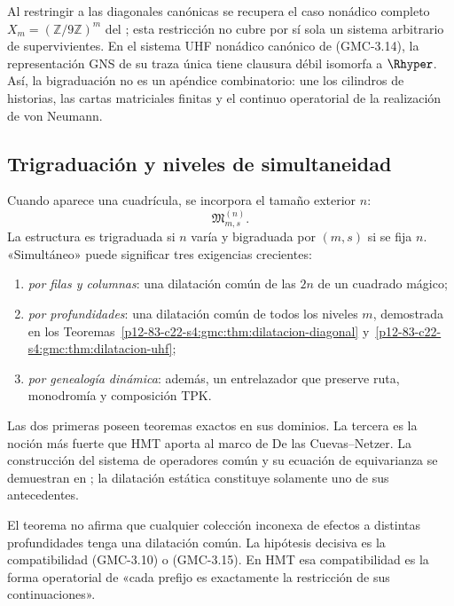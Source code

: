 Al restringir  a las diagonales canónicas se recupera
el caso nonádico completo $X_m=(\mathbb Z/9\mathbb Z)^m$ del
; esta restricción no cubre por sí sola un
sistema arbitrario de supervivientes. En el sistema UHF nonádico canónico de
\textup{(GMC-3.14)}, la representación GNS de su traza única tiene clausura débil
isomorfa a $\Rhyper$. Así, la bigraduación no es un apéndice combinatorio: une
los cilindros de historias, las cartas matriciales finitas y el continuo
operatorial de la realización de von Neumann.

\subsection{Trigraduación y niveles de simultaneidad}

Cuando aparece una cuadrícula, se incorpora el tamaño exterior $n$:
\[
 \mathfrak M_{m,s}^{(n)}.
 \tag{GMC-3.17}
\]
La estructura es trigraduada si $n$ varía y bigraduada por $(m,s)$ si se fija
$n$. «Simultáneo» puede significar tres exigencias crecientes:

\begin{enumerate}
 \item \emph{por filas y columnas}: una dilatación común de las $2n$ \POVM
 de un cuadrado mágico;
 \item \emph{por profundidades}: una dilatación común de todos los niveles
 $m$, demostrada en los Teoremas~\ref{p12-83-c22-s4:gmc:thm:dilatacion-diagonal}
 y~\ref{p12-83-c22-s4:gmc:thm:dilatacion-uhf};
 \item \emph{por genealogía dinámica}: además, un entrelazador que preserve
 ruta, monodromía y composición TPK.
\end{enumerate}

Las dos primeras poseen teoremas exactos en sus dominios. La tercera es la
noción más fuerte que HMT aporta al marco de De las Cuevas--Netzer. La
construcción del sistema de operadores común y su ecuación de equivarianza se
demuestran en ; la dilatación estática constituye
solamente uno de sus antecedentes.

\begin{controlbox}
El teorema no afirma que cualquier colección inconexa de efectos a distintas
profundidades tenga una dilatación común. La hipótesis decisiva es la
compatibilidad \textup{(GMC-3.10)} o \textup{(GMC-3.15)}. En HMT esa compatibilidad es la
forma operatorial de «cada prefijo es exactamente la restricción de sus
continuaciones».
\end{controlbox}


